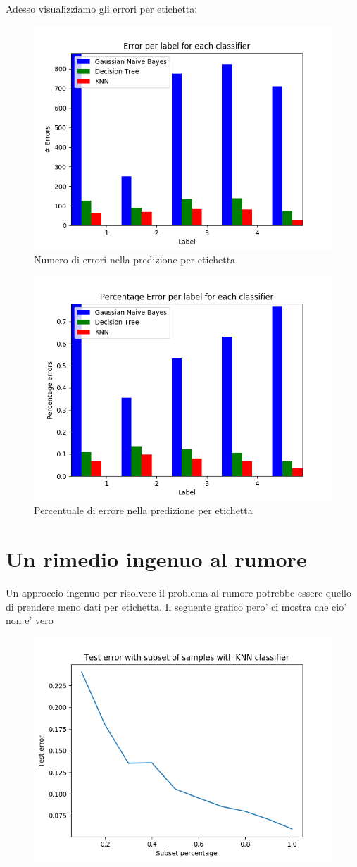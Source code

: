 Adesso visualizziamo gli errori per etichetta:

\begin{figure}[H]
	\centering
	\includegraphics[width=0.7\linewidth]{img/test_error_per_label}
	\caption{Numero di errori nella predizione per etichetta}
	\label{fig:testerrorperlabel}
\end{figure}
\medskip
\begin{figure}[H]
	\centering
	\includegraphics[width=0.7\linewidth]{img/percentage_test_errors_per_label}
	\caption{Percentuale di errore nella predizione per etichetta}
	\label{fig:percentagetesterrorsperlabel}
\end{figure}


\section{Un rimedio ingenuo al rumore}
Un approccio ingenuo per risolvere il problema al rumore potrebbe essere quello di prendere meno dati per etichetta. Il seguente grafico pero' ci mostra che cio' non e' vero

\begin{figure}[H]
	\centering
	\includegraphics[width=0.7\linewidth]{img/rumor_graph_knn}
	\caption{}
	\label{fig:rumorgraphknn}
\end{figure}


